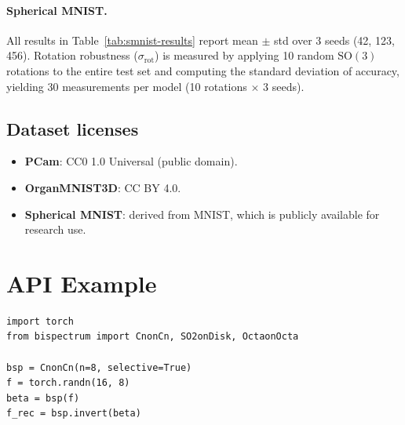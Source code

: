\documentclass{article}
\theoremstyle{definition}
\theoremstyle{remark}
\newcommand{\SO}{\mathrm{SO}}
\theoremstyle{definition}
\begin{document}
\paragraph{Spherical MNIST.}
All results in Table~\ref{tab:smnist-results} report mean $\pm$ std
over 3 seeds (42, 123, 456). Rotation robustness
($\sigma_{\mathrm{rot}}$) is measured by applying 10 random $\SO(3)$
rotations to the entire test set and computing the standard deviation
of accuracy, yielding 30 measurements per model (10 rotations
$\times$ 3 seeds).

\subsection{Dataset licenses}

\begin{itemize}[nosep]
  \item \textbf{PCam}: CC0 1.0 Universal (public domain).
  \item \textbf{OrganMNIST3D}: CC BY 4.0.
  \item \textbf{Spherical MNIST}: derived from MNIST, which is
    publicly available for research use.
\end{itemize}

\section{API Example}
\label{app:api-example}

\begin{lstlisting}
import torch
from bispectrum import CnonCn, SO2onDisk, OctaonOcta

bsp = CnonCn(n=8, selective=True)
f = torch.randn(16, 8)
beta = bsp(f)
f_rec = bsp.invert(beta)
\end{lstlisting}

\newpage

\end{document}
